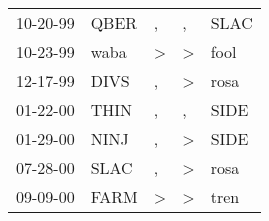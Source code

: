 \begin{supertabular}{p{0.07\textwidth}p{0.06\textwidth}p{0.02\textwidth}p{0.02\textwidth}p{0.06\textwidth}}
 10-20-99\textsuperscript{} &  QBER\textsuperscript{} &             , &             , &  SLAC\textsuperscript{} \\
 10-23-99\textsuperscript{} &  waba\textsuperscript{} &  \textgreater &  \textgreater &  fool\textsuperscript{} \\
 12-17-99\textsuperscript{} &  DIVS\textsuperscript{} &             , &  \textgreater &  rosa\textsuperscript{} \\
 01-22-00\textsuperscript{} &  THIN\textsuperscript{} &             , &             , &  SIDE\textsuperscript{} \\
 01-29-00\textsuperscript{} &  NINJ\textsuperscript{} &             , &  \textgreater &  SIDE\textsuperscript{} \\
 07-28-00\textsuperscript{} &  SLAC\textsuperscript{} &             , &  \textgreater &  rosa\textsuperscript{} \\
 09-09-00\textsuperscript{} &  FARM\textsuperscript{} &  \textgreater &  \textgreater &  tren\textsuperscript{} \\
\end{supertabular}
